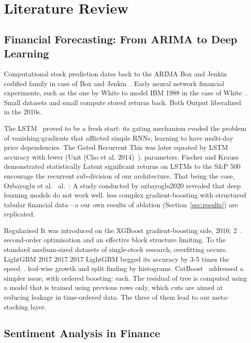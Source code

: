 \documentclass[10pt,a4paper,twoside]{article}
\begin{document}
\section{Literature Review}

\subsection{Financial Forecasting: From ARIMA to Deep Learning}

Computational stock prediction dates back to the ARIMA
Box and Jenkin codified family in case of Box and Jenkin~\cite{box2015}. Early neural network
financial experiments, such as the one by White to model IBM 1988 in the case of White~\cite{white1988}.
Small datasets and small compute stored returns back. Both
Output liberalized in the 2010s.

The LSTM~\cite{hochreiter1997} proved to be a fresh start: its gating
mechanism evaded the problem of vanishing-gradients that afflicted simple RNNs,
learning to have multi-day price dependencies. The Gated Recurrent
This was later equated by LSTM accuracy with fewer (Unit (Cho et al. 2014)~\cite{cho2014}).
parameters. Fischer and Krauss~\cite{fischer2018} demonstrated statistically
Latent significant returns on LSTMs to the S\&P 500 encourage the recurrent
sub-division of our architecture. That being the case, Ozbayoglu et al.~\cite{ozbayoglu2020}
al.~: A study conducted by ozbayoglu2020 revealed that deep learning models do not work well.
less complex gradient-boosting with structured tabular financial data---a
our own results of ablation (Section~\ref{sec:results}) are replicated.

Regularised It was introduced on the XGBoost gradient-boosting side, 2016; 2~\cite{chen2016}.
second-order optimisation and an effective block structure limiting.
To the standard medium-sized datasets of single-stock research, overfitting occurs.
LightGBM 2017 2017 2017 LightGBM begged its accuracy by 3-5 times the speed~\cite{ke2017}.
leaf-wise growth and split finding by histograms. CatBoost~\cite{prokhorenkova2018}
addressed a simpler issue, with ordered boosting: each.
The residual of tree is computed using a model that is trained using previous rows only, which
cuts are aimed at reducing leakage in time-ordered data.
The three of them lead to our meta-stacking layer.

\subsection{Sentiment Analysis in Finance}
\end{document}
